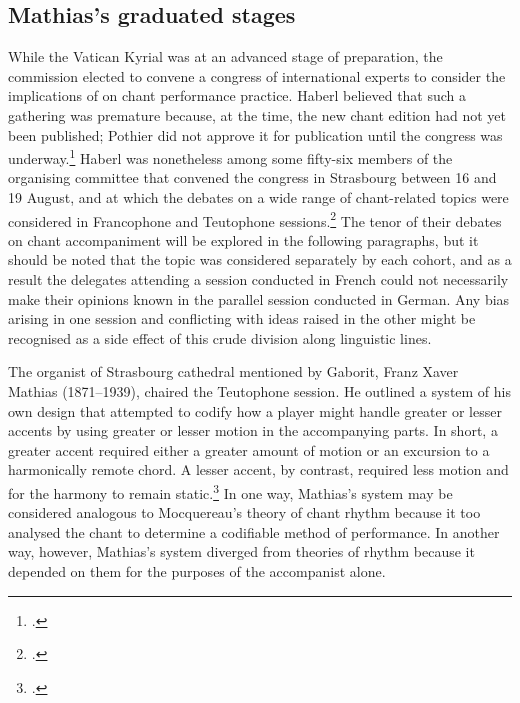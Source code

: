 \subsection{Mathias's graduated stages}
\label{hl:mathias}\label{sc:mathias}%
While the Vatican Kyrial was at an advanced stage of preparation, the commission elected to convene a congress of international experts to consider the implications of \tls{} on chant performance practice.
Haberl believed that such a gathering was premature because, at the time, the new chant edition had not yet been published; Pothier did not approve it for publication until the congress was underway.\footcites[419, 421]{CombeHistoirerestaurationchant1969}[372, 374]{CombeRestorationGregorianChant2003}
Haberl was nonetheless among some fifty-six members of the organising committee that convened the congress in Strasbourg between 16 and 19 August, and at which the debates on a wide range of chant-related topics were considered in Francophone and Teutophone sessions.\footcites[7--8]{VogeleisFestschriftInternationalenKongress1905}[Report referenced in][258]{GeyerviemusicaleStrasbourg1999}
The tenor of their debates on chant accompaniment will be explored in the following paragraphs, but it should be noted that the topic was considered separately by each cohort, and as a result the delegates attending a session conducted in French could not necessarily make their opinions known in the parallel session conducted in German.
Any bias arising in one session and conflicting with ideas raised in the other might be recognised as a side effect of this crude division along linguistic lines.

The organist of Strasbourg cathedral mentioned by Gaborit, Franz Xaver Mathias (1871--1939), chaired the Teutophone session.
He outlined a system of his own design that attempted to codify how a player might handle greater or lesser accents by using greater or lesser motion in the accompanying parts.
In short, a greater accent required either a greater amount of motion or an excursion to a harmonically remote chord.
A lesser accent, by contrast, required less motion and for the harmony to remain static.\footcite[75]{VogeleisFestschriftInternationalenKongress1905}
In one way, Mathias's system may be considered analogous to Mocquereau's theory of chant rhythm because it too analysed the chant to determine a codifiable method of performance.
In another way, however, Mathias's system diverged from theories of rhythm because it depended on them for the purposes of the accompanist alone.

